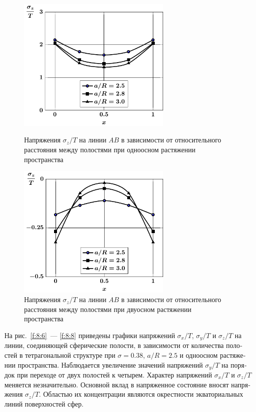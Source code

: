 \begin{russian}
\begin{figure}[h!]
\centering\footnotesize
\parbox[b]{7.5cm}{\centering\includegraphics[width=7.5cm]{cav4-a-d95-t1-sig_z.pdf}
\caption{Напряжения $\sigma_z/T$ на линии $AB$ в зависимости от относительного расстояния между полостями при одноосном растяжении пространства
\label{f:8:105}}}\hfil\hfil
\parbox[b]{7.5cm}{\centering\includegraphics[width=7.5cm]{cav4-a-d95-t2-sig_z.pdf}
\caption{Напряжения $\sigma_z/T$ на линии $AB$ в зависимости от относительного расстояния между полостями при двуосном растяжении пространства
\label{f:8:106}}}
\end{figure}




На рис.~\ref{f:8:6}~--- \ref{f:8:8} приведены графики напряжений $\sigma_x/T$, $\sigma_y/T$ и $\sigma_z/T$ на линии, соединяющей сферические полости, в зависимости от количества полостей в тетрагональной структуре при $\sigma=0.38$, $a/R=2.5$ и одноосном растяжении пространства. Наблюдается увеличение значений напряжений $\sigma_y/T$	на порядок при переходе от двух полостей к четырем. Характер напряжений $\sigma_x/T$ и $\sigma_z/T$ меняется незначительно. Основной вклад в напряженное состояние вносят напряжения $\sigma_z/T$. Областью их концентрации являются окрестности экваториальных линий поверхностей сфер.


\end{russian}
